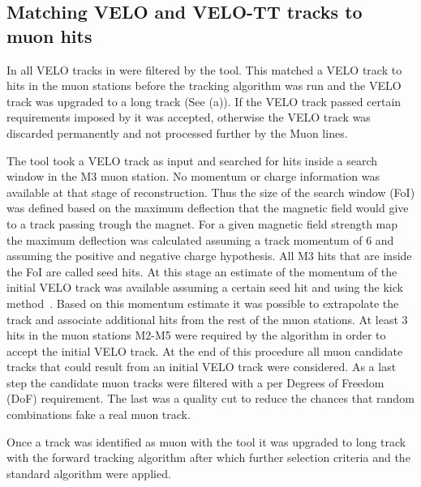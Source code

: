 \subsection{Matching VELO and VELO-TT tracks to muon hits}
\label{sec:muon_matching}

In \runone all VELO tracks in \hltone were filtered by the \mvm tool. This matched a VELO track to hits in the muon
stations before the \FwD tracking algorithm was run and the VELO track was upgraded to a long track (See (a)).
If the VELO track passed certain requirements imposed by \mvm it was accepted, otherwise the VELO track was discarded
permanently and not processed further by the \hltone Muon lines.

The \mvm tool took a VELO track as input and searched for hits inside a search window in the M3 muon station.
No momentum or charge information was available at that stage of reconstruction. Thus the size of the search window (FoI)
was defined based on the maximum deflection that the magnetic field would give to a track passing trough the
\lhcb magnet. For a given magnetic field strength map the maximum deflection was calculated assuming
a track momentum of 6 \gevc and assuming the positive and negative charge hypothesis.
All M3 hits that are inside the FoI are called seed hits.
At this stage an estimate of the momentum of the initial VELO track was available assuming a certain seed hit
and using the kick method~\cite{CERN-THESIS-2015-102}. Based on this momentum estimate it was possible
to extrapolate the track and associate additional hits from the rest of the muon stations.
At least 3 hits in the muon stations M2-M5 were required by the algorithm in order to accept the initial VELO track.
At the end of this procedure all muon candidate tracks that could result from an initial VELO track were considered.
As a last step the candidate muon tracks were filtered with a \chisq per Degrees of Freedom (DoF) requirement.
The last was a quality cut to reduce the chances that random combinations fake a real muon track.

Once a track was identified as muon with the \mvm tool it was upgraded to long track with
the forward tracking algorithm after which further selection criteria and the standard  algorithm were applied.


